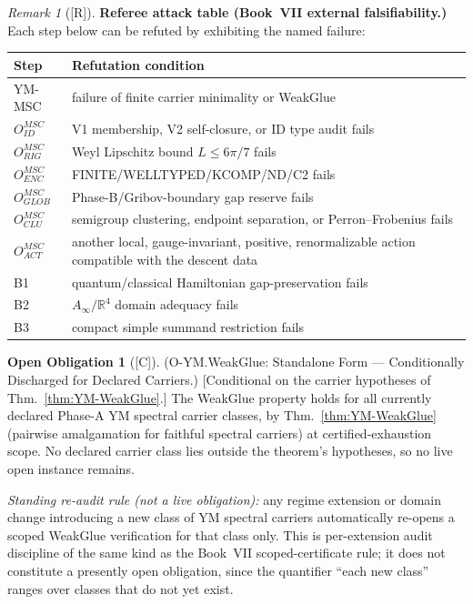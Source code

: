 \documentclass[12pt,oneside]{amsbook}
\theoremstyle{plain}
\theoremstyle{definition}
\newtheorem{obligation}[theorem]{Open Obligation}
\theoremstyle{remark}
\newtheorem{remark}[theorem]{Remark}
\newcommand{\status}[1]{\textup{[#1]}}
\begin{document}
\begin{remark}[\status{R}]\label{rem:YM-referee-attack-table}
\textbf{Referee attack table (Book~VII external falsifiability.)}
Each step below can be refuted by exhibiting the named failure:

\medskip
\noindent\begin{tabular}{|l|p{9cm}|}
\hline
\textbf{Step} & \textbf{Refutation condition} \\
\hline
YM-MSC & failure of finite carrier minimality or WeakGlue \\
$O_{ID}^{MSC}$ & V1 membership, V2 self-closure, or ID type audit fails \\
$O_{RIG}^{MSC}$ & Weyl Lipschitz bound $L \le 6\pi/7$ fails \\
$O_{ENC}^{MSC}$ & FINITE/WELLTYPED/KCOMP/ND/C2 fails \\
$O_{GLOB}^{MSC}$ & Phase-B/Gribov-boundary gap reserve fails \\
$O_{CLU}^{MSC}$ & semigroup clustering, endpoint separation, or Perron--Frobenius fails \\
$O_{ACT}^{MSC}$ & another local, gauge-invariant, positive, renormalizable action compatible with the descent data \\
B1 & quantum/classical Hamiltonian gap-preservation fails \\
B2 & $A_\infty / \mathbb{R}^4$ domain adequacy fails \\
B3 & compact simple summand restriction fails \\
\hline
\end{tabular}
\end{remark}

\begin{obligation}[\status{C}]\label{ob:O-YM-WeakGlue-standalone}
\textup{(O-YM.WeakGlue: Standalone Form --- Conditionally
Discharged for Declared Carriers.)}
\textup{[Conditional on the carrier hypotheses of
Thm.~\ref{thm:YM-WeakGlue}.]}
The WeakGlue property holds for all currently declared Phase-A YM
spectral carrier classes, by Thm.~\ref{thm:YM-WeakGlue}
(pairwise amalgamation for faithful spectral carriers) at
certified-exhaustion scope.  No declared carrier class lies outside
the theorem's hypotheses, so no live open instance remains.

\emph{Standing re-audit rule (not a live obligation):} any regime
extension or domain change introducing a new class of YM spectral
carriers automatically re-opens a scoped WeakGlue verification for
that class only.  This is per-extension audit discipline of the
same kind as the Book~VII scoped-certificate rule; it does not
constitute a presently open obligation, since the quantifier
``each new class'' ranges over classes that do not yet exist.
\end{obligation}
\end{document}
